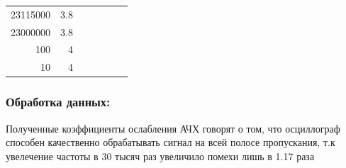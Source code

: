 \documentclass[xcolor=table]{beamer}
\begin{document}
\begin{frame}
{\begin{table}[]
\begin{tabular}{rrlrrrr}
    23115000                                           & 3.8 &                                              &  &  &  &  \\
    23000000                                           & 3.8 &                                              &  &  &  &  \\
    100                                                & 4   &                                              &  &  &  &  \\
    10                                                 & 4   &                                              &  &  &  & 
    \end{tabular}
    \end{table}
}
\end{frame}

\begin{frame}
\frametitle{Обработка данных:}

Полученные коэффициенты ослабления АЧХ говорят о том, что осциллограф способен качественно обрабатывать сигнал на всей полосе пропускания, т.к увелечение частоты в 30 тысяч раз увеличило помехи лишь в 1.17 раза
\end{frame}

%
%
\end{document}
